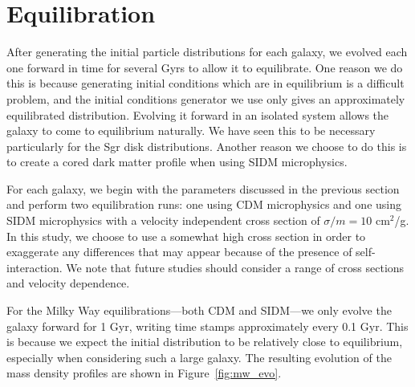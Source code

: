 \hypertarget{equilibration}{%
\section{Equilibration}\label{equilibration}}

After generating the initial particle distributions for each galaxy, we
evolved each one forward in time for several Gyrs to allow it to equilibrate.
One reason we do this is because generating initial conditions which are in
equilibrium is a difficult problem, and the initial conditions generator we use
only gives an approximately equilibrated distribution. Evolving it forward in an
isolated system allows the galaxy to come to equilibrium naturally. We have seen
this to be necessary particularly for the Sgr disk distributions.  Another
reason we choose to do this is to create a cored dark matter profile when
using SIDM microphysics.

For each galaxy, we begin with the parameters discussed in the previous
section and perform two equilibration runs: one using CDM microphysics and one
using SIDM microphysics with a velocity independent cross section of \(\sigma
/ m = 10\) cm\(^2\)/g.  In this study, we choose to use a somewhat high cross
section in order to exaggerate any differences that may appear because of the
presence of self-interaction.  We note that future studies should consider a
range of cross sections and velocity dependence.

For the Milky Way equilibrations---both CDM and SIDM---we only evolve the
galaxy forward for 1 Gyr, writing time stamps approximately every 0.1 Gyr.
This is because we expect the initial distribution to be relatively close to
equilibrium, especially when considering such a large galaxy. The resulting
evolution of the mass density profiles are shown in Figure~\ref{fig:mw_evo}.

